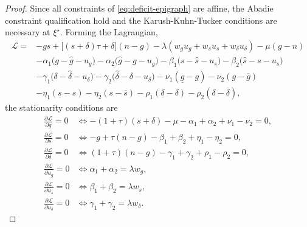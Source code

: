 \documentclass[11pt]{article}
\theoremstyle{plain}
\theoremstyle{definition}
\begin{document}
\begin{proof}
\noindent Since all constraints of \eqref{eq:deficit-epigraph} are affine, the Abadie constraint qualification hold and the Karush-Kuhn-Tucker conditions are necessary at $\xi^\star$.
Forming the Lagrangian, 
\begin{align*}
    \mathcal L
    ={}&
    -gs+\bigl[(s+\delta)\tau+\delta\bigr](n-g)
    -\lambda\left(w_g u_g+w_s u_s+w_\delta u_\delta\right)
    -\mu(g-n)
    \\
    &
    -\alpha_1\bigl(g-\widehat g-u_g\bigr)
    -\alpha_2\bigl(\widehat g-g-u_g\bigr)
    -\beta_1\bigl(s-\widehat s-u_s\bigr)
    -\beta_2\bigl(\widehat s-s-u_s\bigr)
    \\
    &
    -\gamma_1\bigl(\delta-\widehat\delta-u_\delta\bigr)
    -\gamma_2\bigl(\widehat\delta-\delta-u_\delta\bigr)
    -\nu_1(\underline g-g)
    -\nu_2(g-\overline g)
    \\
    &
    -\eta_1(\underline s-s)
    -\eta_2(s-\overline s)
    -\rho_1(\underline\delta-\delta)
    -\rho_2(\delta-\overline\delta),
\end{align*}
the stationarity conditions are
\begin{align}
    \frac{\partial\mathcal L}{\partial g}=0
    &\iff
    -(1+\tau)(s+\delta)
    -\mu-\alpha_1+\alpha_2+\nu_1-\nu_2=0,
    \label{eq:stat-g}
    \\
    \frac{\partial\mathcal L}{\partial s}=0
    &\iff
    -g+\tau(n-g)
    -\beta_1+\beta_2+\eta_1-\eta_2=0,
    \label{eq:stat-s}
    \\
    \frac{\partial\mathcal L}{\partial\delta}=0
    &\iff
    (1+\tau)(n-g)
    -\gamma_1+\gamma_2+\rho_1-\rho_2=0,
    \label{eq:stat-d}
    \\
    \frac{\partial\mathcal L}{\partial u_g}=0
    &\iff
    \alpha_1+\alpha_2=\lambda w_g,
    \label{eq:stat-ug}
    \\
    \frac{\partial\mathcal L}{\partial u_s}=0
    &\iff
    \beta_1+\beta_2=\lambda w_s,
    \label{eq:stat-us}
    \\
    \frac{\partial\mathcal L}{\partial u_\delta}=0
    &\iff
    \gamma_1+\gamma_2=\lambda w_\delta .
    \label{eq:stat-ud}
\end{align}



\end{proof}
\end{document}
